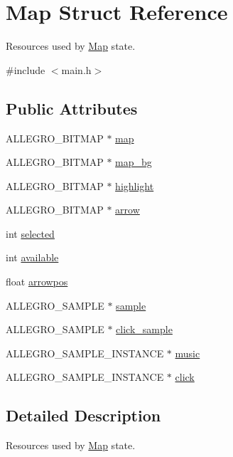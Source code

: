 \hypertarget{structMap}{\section{Map Struct Reference}
\label{structMap}
}


Resources used by \hyperlink{structMap}{Map} state.  




{\ttfamily \#include $<$main.\-h$>$}

\subsection*{Public Attributes}
\begin{DoxyCompactItemize}
\item 
A\-L\-L\-E\-G\-R\-O\-\_\-\-B\-I\-T\-M\-A\-P $\ast$ \hyperlink{structMap_abaf70186fbb2b4b047b8350e3ec5347c}{map}
\item 
A\-L\-L\-E\-G\-R\-O\-\_\-\-B\-I\-T\-M\-A\-P $\ast$ \hyperlink{structMap_ac0b084971832b4466a9d91233452378d}{map\-\_\-bg}
\item 
A\-L\-L\-E\-G\-R\-O\-\_\-\-B\-I\-T\-M\-A\-P $\ast$ \hyperlink{structMap_a703b41e358b7c8ff39bf0d8dd37bb408}{highlight}
\item 
A\-L\-L\-E\-G\-R\-O\-\_\-\-B\-I\-T\-M\-A\-P $\ast$ \hyperlink{structMap_a607f79d7c594540ebf58f88fb999250d}{arrow}
\item 
int \hyperlink{structMap_a07b3269191a003d517977da3adc7f0a4}{selected}
\item 
int \hyperlink{structMap_aa000e129cf19d6d6d9a78cfce0ef58fc}{available}
\item 
float \hyperlink{structMap_a4f395f7bdf7bc0782e29e996e87237bb}{arrowpos}
\item 
A\-L\-L\-E\-G\-R\-O\-\_\-\-S\-A\-M\-P\-L\-E $\ast$ \hyperlink{structMap_a3334bc47109df8757b77c9d3bf67ec5f}{sample}
\item 
A\-L\-L\-E\-G\-R\-O\-\_\-\-S\-A\-M\-P\-L\-E $\ast$ \hyperlink{structMap_abcd15a027ece6075efe4baaf99c7595d}{click\-\_\-sample}
\item 
A\-L\-L\-E\-G\-R\-O\-\_\-\-S\-A\-M\-P\-L\-E\-\_\-\-I\-N\-S\-T\-A\-N\-C\-E $\ast$ \hyperlink{structMap_a17ae4f61c1209816b26940d1c8a88f68}{music}
\item 
A\-L\-L\-E\-G\-R\-O\-\_\-\-S\-A\-M\-P\-L\-E\-\_\-\-I\-N\-S\-T\-A\-N\-C\-E $\ast$ \hyperlink{structMap_a32370a5fb75fcf7d0bebd210cb2a0985}{click}
\end{DoxyCompactItemize}


\subsection{Detailed Description}
Resources used by \hyperlink{structMap}{Map} state. 

